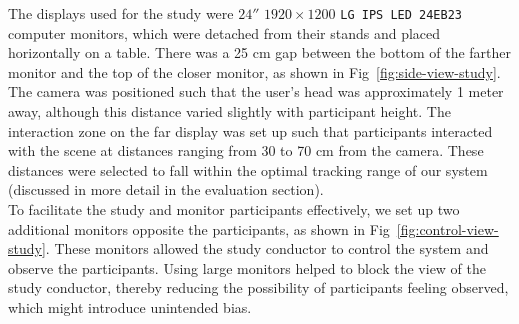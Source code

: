 The displays used for the study were $24''$ $1920 \times 1200$ \texttt{LG IPS LED 24EB23} computer monitors, which were detached from their stands and placed horizontally on a table. There was a 25 cm gap between the bottom of the farther monitor and the top of the closer monitor, as shown in Fig~\ref{fig:side-view-study}. \\

The camera was positioned such that the user’s head was approximately 1 meter away, although this distance varied slightly with participant height. The interaction zone on the far display was set up such that participants interacted with the scene at distances ranging from 30 to 70 cm from the camera. These distances were selected to fall within the optimal tracking range of our system (discussed in more detail in the evaluation section). \\

To facilitate the study and monitor participants effectively, we set up two additional monitors opposite the participants, as shown in Fig~\ref{fig:control-view-study}. These monitors allowed the study conductor to control the system and observe the participants. Using large monitors helped to block the view of the study conductor, thereby reducing the possibility of participants feeling observed, which might introduce unintended bias.

